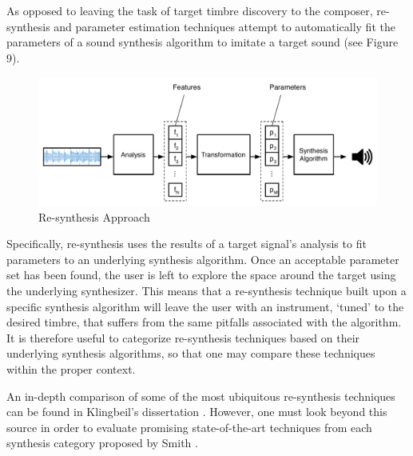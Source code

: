 \documentclass[12pt]{report} 	%
\numberwithin{figure}{chapter}
\numberwithin{table}{chapter}
\numberwithin{equation}{chapter}
\begin{document}
\begin{flushleft}
As opposed to leaving the task of target timbre discovery to the composer, re-synthesis and parameter estimation techniques attempt to automatically fit the parameters of a sound synthesis algorithm to imitate a target sound (see Figure 9). \begin{figure}[h!]
\begin{center}
\includegraphics[scale=0.5]{ResynthesisIdea}
\caption[Re-synthesis]{Re-synthesis Approach}
\end{center}
\end{figure}
Specifically, re-synthesis uses the results of a target signal's analysis to fit parameters to an underlying synthesis algorithm. Once an acceptable parameter set has been found, the user is left to explore the space around the target using the underlying synthesizer. This means that a re-synthesis technique built upon a specific synthesis algorithm will leave the user with an instrument, `tuned' to the desired timbre, that suffers from the same pitfalls associated with the algorithm. It is therefore useful to categorize re-synthesis techniques based on their underlying synthesis algorithms, so that one may compare these techniques within the proper context.

An in-depth comparison of some of the most ubiquitous re-synthesis techniques can be found in Klingbeil's dissertation \cite{Klingbeil:2009lo}. However, one must look beyond this source in order to evaluate promising state-of-the-art techniques from each synthesis category proposed by Smith \cite{III:1991hc}.


\end{flushleft}
\end{document}
